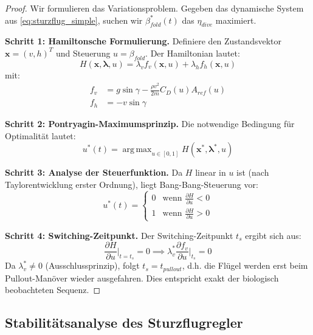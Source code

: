 ﻿\documentclass[12pt,a4paper]{article}
\theoremstyle{remark}
\DeclareMathOperator*{\argmax}{arg\,max}
\begin{document}
	\begin{proof}
		Wir formulieren das Variationsproblem. Gegeben das dynamische System aus \cref{eq:sturzflug_simple}, suchen wir $\beta^*_{fold}(t)$ das $\eta_{dive}$ maximiert.
		
		\textbf{Schritt 1: Hamiltonsche Formulierung.}
		Definiere den Zustandsvektor $\mathbf{x} = (v, h)^T$ und Steuerung $u = \beta_{fold}$. Der Hamiltonian lautet:
		\begin{equation}
			H(\mathbf{x}, \boldsymbol{\lambda}, u) = \lambda_v f_v(\mathbf{x}, u) + \lambda_h f_h(\mathbf{x}, u)
		\end{equation}
		mit:
		\begin{align}
			f_v &= g\sin\gamma - \frac{\rho v^2}{2m} C_D(u) A_{ref}(u) \\
			f_h &= -v\sin\gamma
		\end{align}
		
		\textbf{Schritt 2: Pontryagin-Maximumsprinzip.}
		Die notwendige Bedingung für Optimalität lautet:
		\begin{equation}
			u^*(t) = \argmax_{u \in [0,1]} H(\mathbf{x}^*, \boldsymbol{\lambda}^*, u)
			\label{eq:pmp}
		\end{equation}
		
		\textbf{Schritt 3: Analyse der Steuerfunktion.}
		Da $H$ linear in $u$ ist (nach Taylorentwicklung erster Ordnung), liegt Bang-Bang-Steuerung vor:
		\begin{equation}
			u^*(t) = \begin{cases} 0 & \text{wenn } \frac{\partial H}{\partial u} < 0 \\ 1 & \text{wenn } \frac{\partial H}{\partial u} > 0 \end{cases}
		\end{equation}
		
		\textbf{Schritt 4: Switching-Zeitpunkt.}
		Der Switching-Zeitpunkt $t_s$ ergibt sich aus:
		\begin{equation}
			\frac{\partial H}{\partial u}\bigg|_{t=t_s} = 0 \implies \lambda_v^* \frac{\partial f_v}{\partial u}\bigg|_{t_s} = 0
		\end{equation}
		Da $\lambda_v^* \neq 0$ (Ausschlussprinzip), folgt $t_s = t_{pullout}$, d.h. die Flügel werden erst beim Pullout-Manöver wieder ausgefahren. Dies entspricht exakt der biologisch beobachteten Sequenz.
	\end{proof}
	
	\subsection{Stabilitätsanalyse des Sturzflugregler}
	
\end{document}
